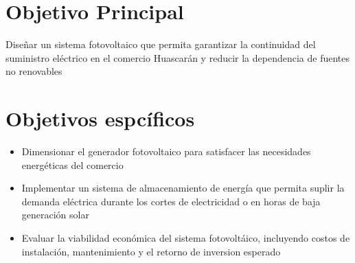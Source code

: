 \section{Objetivo Principal}
Diseñar un sistema fotovoltaico que permita garantizar la continuidad del suministro eléctrico en el comercio Huascarán y reducir la dependencia de fuentes no renovables

\section{Objetivos espcíficos}
\begin{itemize}
  \item Dimensionar el generador fotovoltaico para satisfacer las necesidades energéticas del comercio
  \item Implementar un sistema de almacenamiento de energía que permita suplir la demanda eléctrica durante los cortes de electricidad o en horas de baja generación solar
  \item Evaluar la viabilidad económica del sistema fotovoltáico, incluyendo costos de instalación, mantenimiento y el retorno de inversion esperado
\end{itemize}

